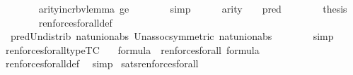 \begin{isabellebody}
\ \ \ \ \ \ \isamarkupfalse%
\ arity{\isacharunderscore}{\kern0pt}incr{\isacharunderscore}{\kern0pt}bv{\isacharunderscore}{\kern0pt}lemma\ ge\isanewline
\ \ \ \ \ \ \isamarkupfalse%
\ simp\isanewline
\ \ \ \ \isamarkupfalse%
\ {\isacartoucheopen}arity{\isacharparenleft}{\kern0pt}{\isasymphi}{\isacharparenright}{\kern0pt}\ {\isasymle}\ {}{\isacartoucheclose}\ {\isacartoucheopen}{\isasymphi}{\isasymin}{\isacharunderscore}{\kern0pt}{\isacartoucheclose}\ {\isacartoucheopen}pred{\isacharcircum}{\kern0pt}{}{\isacharparenleft}{\kern0pt}{\isacharunderscore}{\kern0pt}{\isacharparenright}{\kern0pt}\ {\isasymle}\ {}{\isacartoucheclose}\isanewline
\ \ \ \ \isamarkupfalse%
\ {\isacharquery}{\kern0pt}thesis\isanewline
\ \ \ \ \ \ \isamarkupfalse%
\ ren{\isacharunderscore}{\kern0pt}forces{\isacharunderscore}{\kern0pt}forall{\isacharunderscore}{\kern0pt}def\isanewline
\ \ \ \ \ \ \isamarkupfalse%
\ \ pred{\isacharunderscore}{\kern0pt}Un{\isacharunderscore}{\kern0pt}distrib\ nat{\isacharunderscore}{\kern0pt}union{\isacharunderscore}{\kern0pt}abs{}\ Un{\isacharunderscore}{\kern0pt}assoc{\isacharbrackleft}{\kern0pt}symmetric{\isacharbrackright}{\kern0pt}\ nat{\isacharunderscore}{\kern0pt}union{\isacharunderscore}{\kern0pt}abs{}\isanewline
\ \ \ \ \ \ \isamarkupfalse%
\ simp\isanewline
\ \ \isamarkupfalse%
\isanewline
{}\isamarkupfalse%
%
\endisatagproof
{\isafoldproof}%
%
\isadelimproof
\isanewline
%
\endisadelimproof
\isanewline
{}\isamarkupfalse%
\ ren{\isacharunderscore}{\kern0pt}forces{\isacharunderscore}{\kern0pt}forall{\isacharunderscore}{\kern0pt}type{\isacharbrackleft}{\kern0pt}TC{\isacharbrackright}{\kern0pt}\ {\isacharcolon}{\kern0pt}\isanewline
\ \ {\isachardoublequoteopen}{\isasymphi}{\isasymin}formula\ {\isasymLongrightarrow}\ ren{\isacharunderscore}{\kern0pt}forces{\isacharunderscore}{\kern0pt}forall{\isacharparenleft}{\kern0pt}{\isasymphi}{\isacharparenright}{\kern0pt}\ {\isasymin}formula{\isachardoublequoteclose}\isanewline
%
\isadelimproof
\ \ %
\endisadelimproof
%
\isatagproof
{}\isamarkupfalse%
\ ren{\isacharunderscore}{\kern0pt}forces{\isacharunderscore}{\kern0pt}forall{\isacharunderscore}{\kern0pt}def\ \isamarkupfalse%
\ simp%
\endisatagproof
{\isafoldproof}%
%
\isadelimproof
\isanewline
%
\endisadelimproof
\isanewline
{}\isamarkupfalse%
\ sats{\isacharunderscore}{\kern0pt}ren{\isacharunderscore}{\kern0pt}forces{\isacharunderscore}{\kern0pt}forall\ {\isacharcolon}{\kern0pt}\isanewline

\end{isabellebody}
